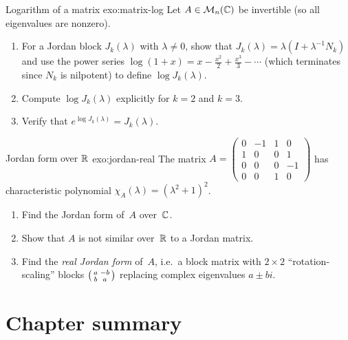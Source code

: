 \begin{exercise}{Logarithm of a matrix \challenging}{exo:matrix-log}
Let $A \in \mathcal{M}_n({\mathbb{C}})$ be invertible (so all eigenvalues are nonzero).
\begin{enumerate}[label=(\alph*)]
  \item For a Jordan block $J_k(\lambda)$ with $\lambda \neq 0$,
    show that $J_k(\lambda) = \lambda(I + \lambda^{-1}N_k)$ and use
    the power series $\log(1 + x) = x - \frac{x^2}{2} +
    \frac{x^3}{3} - \cdots$ (which terminates since $N_k$ is
    nilpotent) to define $\log J_k(\lambda)$.
  \item Compute $\log J_k(\lambda)$ explicitly for $k = 2$ and $k = 3$.
  \item Verify that $e^{\log J_k(\lambda)} = J_k(\lambda)$.
\end{enumerate}
\end{exercise}

\begin{exercise}{Jordan form over ${\mathbb{R}}$ \challenging}{exo:jordan-real}
The matrix
$A = \begin{pmatrix} 0 & -1 & 1 & 0 \\ 1 & 0 & 0 & 1 \\
0 & 0 & 0 & -1 \\ 0 & 0 & 1 & 0 \end{pmatrix}$
has characteristic polynomial $\chi_A(\lambda) = (\lambda^2+1)^2$.
\begin{enumerate}[label=(\alph*)]
  \item Find the Jordan form of~$A$ over~${\mathbb{C}}$.
  \item Show that $A$ is not similar over~${\mathbb{R}}$ to a Jordan matrix.
  \item Find the \emph{real Jordan form} of~$A$, i.e.\ a block
    matrix with $2\times 2$ ``rotation-scaling'' blocks
    $\begin{psmallmatrix} a & -b \\ b & a \end{psmallmatrix}$
    replacing complex eigenvalues $a \pm bi$.
\end{enumerate}
\end{exercise}


\section{Chapter summary}\label{sec:jordan-summary}


